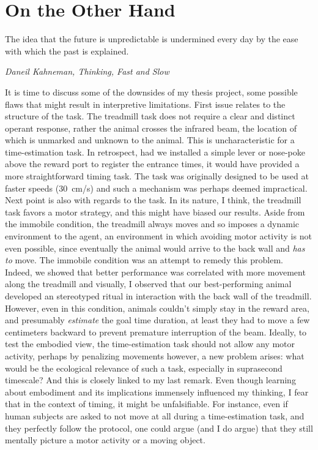 \section{On the Other Hand}
\epigraph{The idea that the future is unpredictable is undermined every day by the ease with which the past is explained.}
{\textit{Daneil Kahneman, Thinking, Fast and Slow}}
\noindent
It is time to discuss some of the downsides of my thesis project, some possible flaws that might result in interpretive limitations.
First issue relates to the structure of the task.
The treadmill task does not require a clear and distinct operant response, rather the animal crosses the infrared beam, the location of which is unmarked and unknown to the animal.
This is uncharacteristic for a time-estimation task.
In retrospect, had we installed a simple lever or nose-poke above the reward port to register the entrance times, it would have provided a more straightforward timing task.
The task was originally designed to be used at faster speeds (30~cm/s) and such a mechanism was perhaps deemed impractical.
Next point is also with regards to the task.
In its nature, I think, the treadmill task favors a motor strategy, and this might have biased our results.
Aside from the immobile condition, the treadmill always moves and so imposes a dynamic environment to the agent, an environment in which avoiding motor activity is not even possible, since eventually the animal would arrive to the back wall and \textit{has to} move.
The immobile condition was an attempt to remedy this problem.
Indeed, we showed that better performance was correlated with more movement along the treadmill and visually, I observed that our best-performing animal developed an stereotyped ritual in interaction with the back wall of the treadmill.
However, even in this condition, animals couldn't simply stay in the reward area, and presumably \textit{estimate} the goal time duration, at least they had to move a few centimeters backward to prevent premature interruption of the beam.
Ideally, to test the embodied view, the time-estimation task should not allow any motor activity, perhaps by penalizing movements however, a new problem arises:
what would be the ecological relevance of such a task, especially in suprasecond timescale?
And this is closely linked to my last remark.
Even though learning about embodiment and its implications immensely influenced my thinking, I fear that in the context of timing, it might be unfalsifiable.
For instance, even if human subjects are asked to not move at all during a time-estimation task, and they perfectly follow the protocol, one could argue (and I do argue) that they still mentally picture a motor activity or a moving object.
